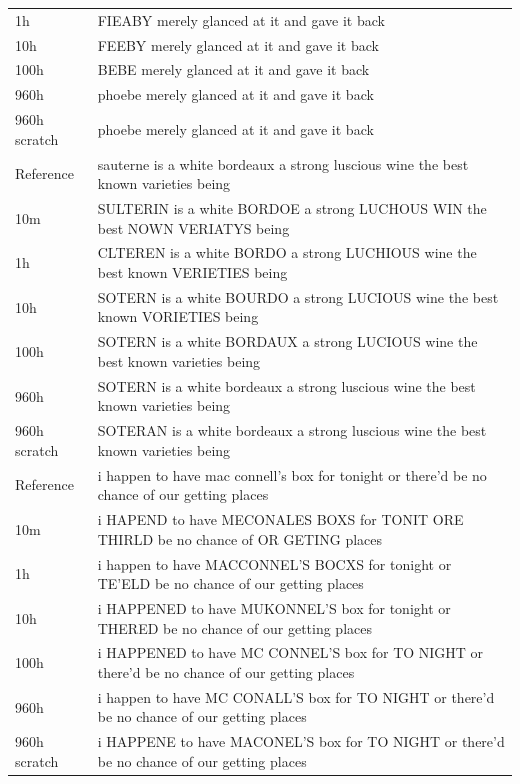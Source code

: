 \documentclass{article}
\begin{document}
\begin{table}
{\begin{tabular}{l|l}
1h \voxsz{} & FIEABY merely glanced at it and gave it back \\
10h \voxsz{} & FEEBY  merely glanced at it and gave it back \\
100h \voxsz{} & BEBE   merely glanced at it and gave it back \\
960h \voxsz{} & phoebe merely glanced at it and gave it back \\
960h scratch & phoebe merely glanced at it and gave it back \\
\midrule
Reference & sauterne is a white bordeaux a strong luscious wine the best known varieties being \\
10m \voxsz{} & SULTERIN is a white BORDOE   a strong LUCHOUS  WIN  the best NOWN  VERIATYS  being \\
1h \voxsz{} & CLTEREN  is a white BORDO    a strong LUCHIOUS wine the best known VERIETIES being \\
10h \voxsz{} & SOTERN   is a white BOURDO   a strong LUCIOUS  wine the best known VORIETIES being \\
100h \voxsz{} & SOTERN   is a white BORDAUX  a strong LUCIOUS  wine the best known varieties being \\
960h \voxsz{} & SOTERN   is a white bordeaux a strong luscious wine the best known varieties being \\
960h scratch & SOTERAN  is a white bordeaux a strong luscious wine the best known varieties being \\
\midrule
Reference & i happen to have mac connell's box for tonight or there'd be no chance of our getting places \\
10m \voxsz{} & i HAPEND to have MECONALES BOXS for TONIT ORE THIRLD  be no chance of OR  GETING  places \\
1h \voxsz{} & i happen to have MACCONNEL'S BOCXS for tonight or TE'ELD  be no chance of our getting places \\
10h \voxsz{} & i HAPPENED to have MUKONNEL'S box for tonight or THERED  be no chance of our getting places \\
100h \voxsz{} & i HAPPENED to have MC  CONNEL'S  box for TO NIGHT or there'd be no chance of our getting places \\
960h \voxsz{} & i happen to have MC  CONALL'S  box for TO NIGHT   or there'd be no chance of our getting places \\
960h scratch & i HAPPENE to have MACONEL'S box for TO NIGHT   or there'd be no chance of our getting places \\
\bottomrule
\end{tabular}}
\end{table}
\end{document}
